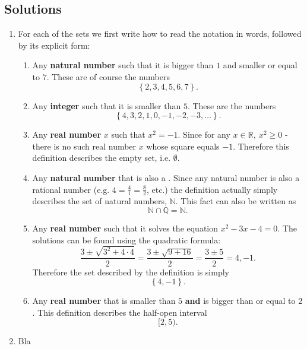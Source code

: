 \subsection{Solutions}
\begin{enumerate}
	\item For each of the sets we first write how to read the notation in words, followed by its explicit form:
		\begin{enumerate}[label={(\roman*)}]
		\item Any \textbf{natural number} such that it is bigger than $1$ and smaller or equal to $7$. These are of course the numbers
			\[
				\left\{2,3,4,5,6,7\right\}.
			\]
		
		\item Any \textbf{integer} such that it is smaller than $5$. These are the numbers
			\[
				\left\{4,3,2,1,0,-1,-2,-3,\dots\right\}.
			\]
		
		\item Any \textbf{real number} $x$ such that $x^{2}=-1$. Since for any $x\in\mathbb{R},\ x^{2}\geq0$ - there is no such real number $x$ whose square equals $-1$. Therefore this definition describes the empty set, i.e. $\emptyset$.
		
		\item Any \textbf{natural number} that is also a . Since any natural number is also a rational number (e.g. $4=\frac{4}{1}=\frac{8}{2}$, etc.) the definition actually simply describes the set of natural numbers, $\mathbb{N}$. This fact can also be written as
			\[
				\mathbb{N} \cap \mathbb{Q} = \mathbb{N}.
			\]
		
		\item Any \textbf{real number} such that it solves the equation $x^{2}-3x-4=0$. The solutions can be found using the quadratic formula:
			\[
				\frac{3\pm\sqrt{3^{2}+4\cdot4}}{2} = \frac{3\pm\sqrt{9+16}}{2} = \frac{3\pm5}{2} = 4,-1.
			\]
			Therefore the set described by the definition is simply
			\[
				\left\{4,-1\right\}.
			\]
		
		\item Any \textbf{real number} that is smaller than $5$ \textbf{and} is bigger than or equal to $2$. This definition describes the half-open interval
			\[
				[2,5).
			\]
	\end{enumerate}
\item Bla
\end{enumerate}

